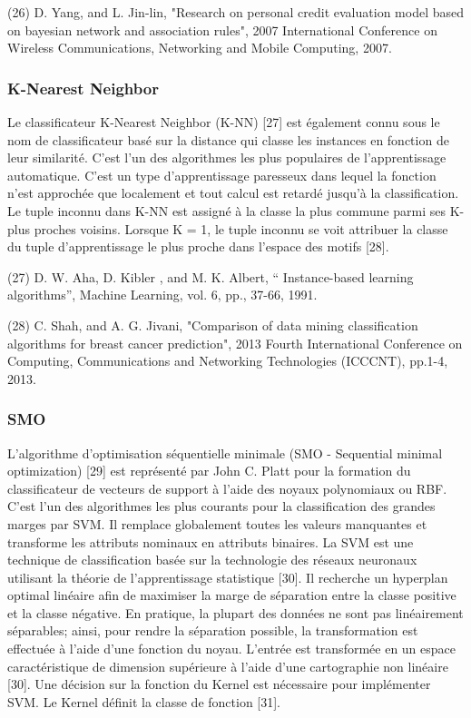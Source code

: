 (26) D. Yang, and L. Jin-lin, "Research on personal credit evaluation model based on bayesian network and association rules", 2007 International Conference on Wireless Communications, Networking and Mobile Computing, 2007.

\subsubsection{K-Nearest Neighbor}
Le classificateur K-Nearest Neighbor (K-NN) [27] est également connu sous le nom de classificateur basé sur la distance qui classe les instances en fonction de leur similarité. C'est l'un des algorithmes les plus populaires de l'apprentissage automatique. C'est un type d'apprentissage paresseux dans lequel la fonction n'est approchée que localement et tout calcul est retardé jusqu'à la classification. Le tuple inconnu dans K-NN est assigné à la classe la plus commune parmi ses K-plus proches voisins. Lorsque K = 1, le tuple inconnu se voit attribuer la classe du tuple d'apprentissage le plus proche dans l'espace des motifs [28].

(27) D. W. Aha, D. Kibler , and M. K. Albert, “ Instance-based learning algorithms”, Machine Learning, vol. 6, pp., 37-66, 1991.

(28) C. Shah, and A. G. Jivani, "Comparison of data mining classification algorithms for breast cancer prediction", 2013 Fourth International Conference on Computing, Communications and Networking Technologies (ICCCNT), pp.1-4, 2013.

\subsubsection{SMO}
L'algorithme d'optimisation séquentielle minimale (SMO - Sequential minimal optimization) [29] est représenté par John C. Platt pour la formation du classificateur de vecteurs de support à l'aide des noyaux polynomiaux ou RBF. C'est l'un des algorithmes les plus courants pour la classification des grandes marges par SVM. Il remplace globalement toutes les valeurs manquantes et transforme les attributs nominaux en attributs binaires. La SVM est une technique de classification basée sur la technologie des réseaux neuronaux utilisant la théorie de l'apprentissage statistique [30]. Il recherche un hyperplan optimal linéaire afin de maximiser la marge de séparation entre la classe positive et la classe négative. En pratique, la plupart des données ne sont pas linéairement séparables; ainsi, pour rendre la séparation possible, la transformation est effectuée à l'aide d'une fonction du noyau. L'entrée est transformée en un espace caractéristique de dimension supérieure à l'aide d'une cartographie non linéaire [30]. Une décision sur la fonction du Kernel est nécessaire pour implémenter SVM. Le Kernel définit la classe de fonction [31].

